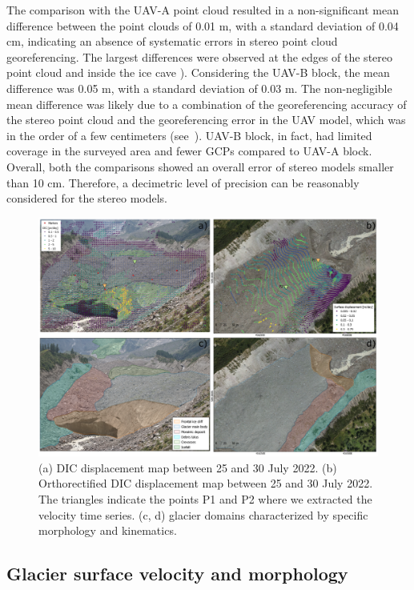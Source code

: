 The comparison with the UAV-A point cloud resulted in a non-significant mean difference between the point clouds of 0.01 m, with a standard deviation of 0.04 cm, indicating an absence of systematic errors in stereo point cloud georeferencing. 
The largest differences were observed at the edges of the stereo point cloud and inside the ice cave ).
Considering the UAV-B block, the mean difference was 0.05 m, with a standard deviation of 0.03 m.
The non-negligible mean difference was likely due to a combination of the georeferencing accuracy of the stereo point cloud and the georeferencing error in the UAV model, which was in the order of a few centimeters (see~).
UAV-B block, in fact, had limited coverage in the surveyed area and fewer GCPs
compared to UAV-A block.
Overall, both the comparisons showed an overall error of stereo models smaller than 10 cm.
Therefore, a decimetric level of precision can be reasonably considered for the stereo models.

\begin{figure}[ht]
  \includegraphics[width=\textwidth]{4_dic_composition.png}
  \caption{(a) DIC displacement map between 25 and 30 July 2022. (b) Orthorectified DIC
    displacement map between 25 and 30 July 2022. The triangles indicate the points P1
    and P2 where we extracted the velocity time series.
    (c, d) glacier domains characterized by specific morphology and kinematics. }
  \label{fig:4:dic_results}
\end{figure}

\subsection{Glacier surface velocity and morphology}\label{sec:4:res_velocity}

